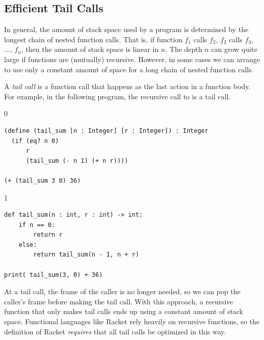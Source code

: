 \documentclass[7x10,nocrop]{TimesAPriori_MIT}%
\def\racketEd{0}
\def\pythonEd{1}
\def\edition{1}
\begin{document}

\subsection{Efficient Tail Calls}
\label{sec:tail-call}

In general, the amount of stack space used by a program is determined
by the longest chain of nested function calls. That is, if function
$f_1$ calls $f_2$, $f_2$ calls $f_3$, $\ldots$, $f_n$, then the amount
of stack space is linear in $n$.  The depth $n$ can grow quite large
if functions are (mutually) recursive. However, in
some cases we can arrange to use only a constant amount of space for a
long chain of nested function calls.

A \emph{tail call} is a function call that
happens as the last action in a function body. 
For example, in the following
program, the recursive call to  is a tail call.
\begin{center}
{\if\edition\racketEd  
\begin{lstlisting}
(define (tail_sum [n : Integer] [r : Integer]) : Integer
  (if (eq? n 0) 
      r
      (tail_sum (- n 1) (+ n r))))

(+ (tail_sum 3 0) 36)
\end{lstlisting}
\fi}
{\if\edition\pythonEd
\begin{lstlisting}
def tail_sum(n : int, r : int) -> int:
    if n == 0:
        return r
    else:
        return tail_sum(n - 1, n + r)

print( tail_sum(3, 0) + 36)
\end{lstlisting}
\fi}
\end{center}
At a tail call, the frame of the caller is no longer needed, so we can
pop the caller's frame before making the tail call. With this
approach, a recursive function that only makes tail calls ends up 
using a constant amount of stack space.  Functional languages like
Racket rely heavily on recursive functions, so the definition of
Racket \emph{requires} that all tail calls be optimized in this way.
\end{document}
